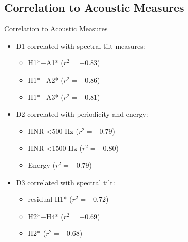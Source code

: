 \documentclass{beamer}
\begin{document}
\subsection{Correlation to Acoustic Measures}
\begin{frame}{Correlation to Acoustic Measures}
  \begin{itemize}
    \item D1 correlated with spectral tilt measures: 
    \begin{itemize}
      \item H1*$-$A1* ($r^2 = -0.83$) 
      \item H1*$-$A2* ($r^2 = -0.86$)
      \item H1*$-$A3* ($r^2 = -0.81$)
    \end{itemize}
    \item D2 correlated with periodicity and energy: 
    \begin{itemize}
      \item HNR \textless 500 Hz ($r^2 = -0.79$)
      \item HNR \textless 1500 Hz ($r^2 = -0.80$)
      \item Energy ($r^2 = -0.79$)
    \end{itemize}
    \item D3 correlated with spectral tilt:
    \begin{itemize}
      \item residual H1* ($r^2 = -0.72$)
      \item H2*$-$H4* ($r^2 = -0.69$)
      \item H2* ($r^2 = -0.68$)
    \end{itemize}
  \end{itemize}
\end{frame}
\end{document}
